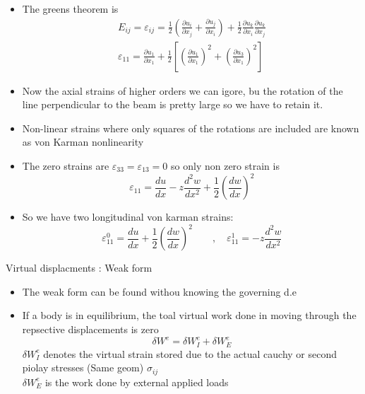 	\begin{frame}
		\begin{itemize}
			\item The greens theorem is
			\begin{equation}
				\begin{aligned}
					E_{ij} = \varepsilon_{ij} = \frac{1}{2}\left(\frac{\partial u_i}{\partial x_j} + \frac{\partial u_j}{\partial x_i} \right) + \frac{1}{2}\frac{\partial u_k}{\partial x_i}\frac{\partial u_k}{\partial x_j}\\
					\varepsilon_{11} = \frac{\partial u_1}{\partial x_1} + \frac{1}{2}\left[\left(\frac{\partial u_1}{\partial x_1} \right)^2 + \left(\frac{\partial u_3}{\partial x_1} \right)^2 \right]
				\end{aligned}
			\end{equation}
			\item Now the axial strains of higher orders we can igore, bu the rotation of the line perpendicular to the beam is pretty large so we have to retain it.
			\item Non-linear strains where only squares of the rotations are included are known as von Karman nonlinearity 
			\item The zero strains are $\varepsilon_{33} = \varepsilon_{13} = 0$ so only non zero strain is
			\begin{equation}
				\varepsilon_{11} = \frac{d u}{d x} - z\frac{d^2 w}{d x^2} + \frac{1}{2} \left(\frac{dw}{dx} \right)^2 
			\end{equation}
			\item  So we have two longitudinal von karman strains:
			\begin{equation}
				\varepsilon^0_{11} = \frac{d u}{d x} + \frac{1}{2} \left(\frac{dw}{dx} \right)^2  \qquad ,  \quad 
				\varepsilon^1_{11} = - z\frac{d^2 w}{d x^2} 
			\end{equation}
		\end{itemize}
	\end{frame}


	\begin{frame}{Virtual displacments : Weak form}
		\begin{itemize}
			\item The weak form can be found withou knowing the governing d.e
			\item If a body is in equilibrium, the toal virtual work done in moving through the repsective displacements is zero
			\begin{equation}
				\delta W^e = \delta W_I^e + \delta W_E^e
			\end{equation}
			$\delta W_I^e$ denotes the virtual strain stored due to the actual cauchy or second piolay stresses (Same geom) $\sigma_{ij}$\\
			$\delta W_E^e$ is the work done by external applied loads	
		\end{itemize}
	\end{frame}



